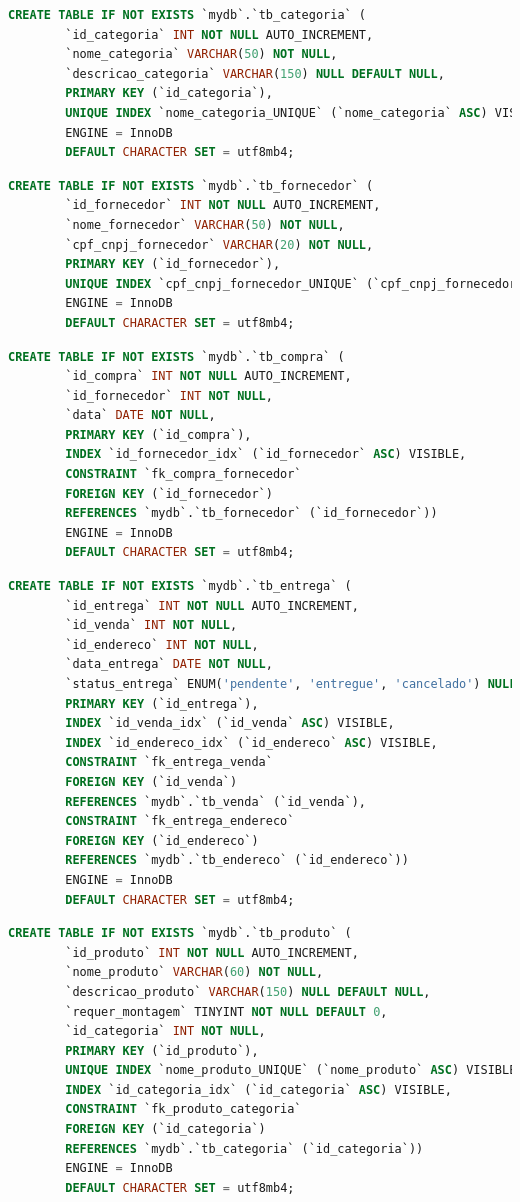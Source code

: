 \documentclass[
12pt,
a4paper,
semrecuonosumario,
sumario = abnt-6027-2012]{report}
\begin{document}
    \begin{lstlisting}[language=SQL,caption={DDL -- Tabela \texttt{tb\_categoria}}]
		CREATE TABLE IF NOT EXISTS `mydb`.`tb_categoria` (
		`id_categoria` INT NOT NULL AUTO_INCREMENT,
		`nome_categoria` VARCHAR(50) NOT NULL,
		`descricao_categoria` VARCHAR(150) NULL DEFAULT NULL,
		PRIMARY KEY (`id_categoria`),
		UNIQUE INDEX `nome_categoria_UNIQUE` (`nome_categoria` ASC) VISIBLE)
		ENGINE = InnoDB
		DEFAULT CHARACTER SET = utf8mb4;
    \end{lstlisting}
    \begin{lstlisting}[language=SQL,caption={DDL -- Tabela \texttt{tb\_fornecedor}}]
		CREATE TABLE IF NOT EXISTS `mydb`.`tb_fornecedor` (
		`id_fornecedor` INT NOT NULL AUTO_INCREMENT,
		`nome_fornecedor` VARCHAR(50) NOT NULL,
		`cpf_cnpj_fornecedor` VARCHAR(20) NOT NULL,
		PRIMARY KEY (`id_fornecedor`),
		UNIQUE INDEX `cpf_cnpj_fornecedor_UNIQUE` (`cpf_cnpj_fornecedor` ASC) VISIBLE)
		ENGINE = InnoDB
		DEFAULT CHARACTER SET = utf8mb4;
    \end{lstlisting}
    \begin{lstlisting}[language=SQL,caption={DDL -- Tabela \texttt{tb\_compra}}]
		CREATE TABLE IF NOT EXISTS `mydb`.`tb_compra` (
		`id_compra` INT NOT NULL AUTO_INCREMENT,
		`id_fornecedor` INT NOT NULL,
		`data` DATE NOT NULL,
		PRIMARY KEY (`id_compra`),
		INDEX `id_fornecedor_idx` (`id_fornecedor` ASC) VISIBLE,
		CONSTRAINT `fk_compra_fornecedor`
		FOREIGN KEY (`id_fornecedor`)
		REFERENCES `mydb`.`tb_fornecedor` (`id_fornecedor`))
		ENGINE = InnoDB
		DEFAULT CHARACTER SET = utf8mb4;
    \end{lstlisting}
    \begin{lstlisting}[language=SQL,caption={DDL -- Tabela \texttt{tb\_entrega}}]
		CREATE TABLE IF NOT EXISTS `mydb`.`tb_entrega` (
		`id_entrega` INT NOT NULL AUTO_INCREMENT,
		`id_venda` INT NOT NULL,
		`id_endereco` INT NOT NULL,
		`data_entrega` DATE NOT NULL,
		`status_entrega` ENUM('pendente', 'entregue', 'cancelado') NULL DEFAULT 'pendente',
		PRIMARY KEY (`id_entrega`),
		INDEX `id_venda_idx` (`id_venda` ASC) VISIBLE,
		INDEX `id_endereco_idx` (`id_endereco` ASC) VISIBLE,
		CONSTRAINT `fk_entrega_venda`
		FOREIGN KEY (`id_venda`)
		REFERENCES `mydb`.`tb_venda` (`id_venda`),
		CONSTRAINT `fk_entrega_endereco`
		FOREIGN KEY (`id_endereco`)
		REFERENCES `mydb`.`tb_endereco` (`id_endereco`))
		ENGINE = InnoDB
		DEFAULT CHARACTER SET = utf8mb4;
    \end{lstlisting}
    \begin{lstlisting}[language=SQL,caption={DDL -- Tabela \texttt{tb\_produto}}]
		CREATE TABLE IF NOT EXISTS `mydb`.`tb_produto` (
		`id_produto` INT NOT NULL AUTO_INCREMENT,
		`nome_produto` VARCHAR(60) NOT NULL,
		`descricao_produto` VARCHAR(150) NULL DEFAULT NULL,
		`requer_montagem` TINYINT NOT NULL DEFAULT 0,
		`id_categoria` INT NOT NULL,
		PRIMARY KEY (`id_produto`),
		UNIQUE INDEX `nome_produto_UNIQUE` (`nome_produto` ASC) VISIBLE,
		INDEX `id_categoria_idx` (`id_categoria` ASC) VISIBLE,
		CONSTRAINT `fk_produto_categoria`
		FOREIGN KEY (`id_categoria`)
		REFERENCES `mydb`.`tb_categoria` (`id_categoria`))
		ENGINE = InnoDB
		DEFAULT CHARACTER SET = utf8mb4;
    \end{lstlisting}
\end{document}
